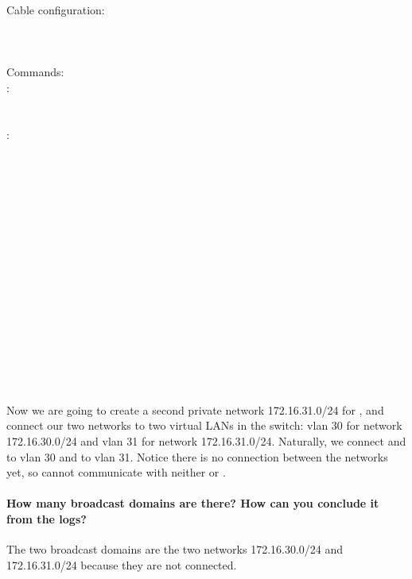 \documentclass[compilation.tex]{subfiles}
\begin{document}
\begin{cables}{14}{0.3}
	Cable configuration:\\
	\\
	\\
	\\
	
	Commands:\\
	:\\
	\\
	\\
	:\\
	\\
	\\
	\\
	\\
	\\
	\\
	\\
	\\
	\\
	\\
	\\
	\\
	\\
	\\
	\\
	\\
\end{cables}

Now we are going to create a second private network 172.16.31.0/24 for , and connect our two networks to two virtual LANs in the switch: vlan 30 for network 172.16.30.0/24 and vlan 31 for network 172.16.31.0/24.
Naturally, we connect  and  to vlan 30 and  to vlan 31. Notice there is no connection between the networks yet, so  cannot communicate with neither  or .

\paragraph{How many broadcast domains are there? How can you conclude it from the logs?}
The two broadcast domains are the two networks 172.16.30.0/24 and 172.16.31.0/24 because they are not connected.
\end{document}
